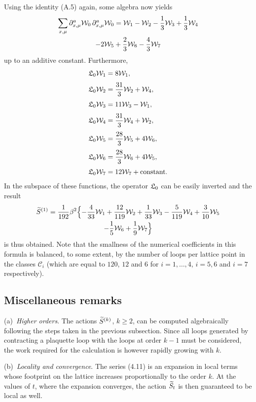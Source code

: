 Using the identity (A.5) again, some algebra now yields
\begin{multline}
  \sum_{x,\mu}\partial^a_{x,\mu}\mathcal{W}_0\,\partial^a_{x,\mu}\mathcal{W}_0
  =\mathcal{W}_1-\mathcal{W}_2-\frac{1}{3}\mathcal{W}_3+\frac{1}{3}\mathcal{W}_4\\
  -2\mathcal{W}_5+\frac{2}{3}\mathcal{W}_6-\frac{4}{3}\mathcal{W}_7
\end{multline}
up to an additive constant. Furthermore,
\begin{align}
  \mathfrak{L}_0\mathcal{W}_1&=8\mathcal{W}_1,
  \\[0.6ex]
  \mathfrak{L}_0\mathcal{W}_2&=\frac{31}{3}\mathcal{W}_2+\mathcal{W}_4,
  \\[0.6ex]
  \mathfrak{L}_0\mathcal{W}_3&=11\mathcal{W}_3-\mathcal{W}_1,
  \\[0.6ex]
  \mathfrak{L}_0\mathcal{W}_4&=\frac{31}{3}\mathcal{W}_4+\mathcal{W}_2,
  \\[0.6ex]
  \mathfrak{L}_0\mathcal{W}_5&=\frac{28}{3}\mathcal{W}_5+4\mathcal{W}_6,
  \\[0.6ex]
  \mathfrak{L}_0\mathcal{W}_6&=\frac{28}{3}\mathcal{W}_6+4\mathcal{W}_5,
  \\[0.6ex]
  \mathfrak{L}_0\mathcal{W}_7&=12\mathcal{W}_7+\text{constant}.
\end{align}
In the subspace of these functions,
the operator $\mathfrak{L}_0$ can be easily inverted
and the result
\begin{multline}
  \widetilde{S}^{(1)}=\frac{1}{192}\beta^2\Bigl\{
  -\frac{4}{33}\mathcal{W}_1
  +\frac{12}{119}\mathcal{W}_2
  +\frac{1}{33}\mathcal{W}_3
  -\frac{5}{119}\mathcal{W}_4
  +\frac{3}{10}\mathcal{W}_5\\
  -\frac{1}{5}\mathcal{W}_6
  +\frac{1}{9}\mathcal{W}_7\Bigr\}
\end{multline}
is thus obtained.
Note that the smallness of the numerical coefficients in this formula
is balanced, to some extent,
by the number of loops per lattice point
in the classes $\mathcal{C}_i$ (which are equal to
$120$, $12$ and $6$ for $i=1,\ldots,4$, $i=5,6$ and $i=7$ respectively).


\subsection{Miscellaneous remarks}

\noindent
(a)~{\itshape Higher orders}.
The actions $\widetilde{S}^{(k)}$, $k\geq2$, can
be computed algebraically
following the steps taken in the previous subsection.
Since all loops generated by contracting
a plaquette loop with the loops at order $k-1$
must be considered, the work required for
the calculation
is however rapidly growing with $k$.

\smallskip
\noindent
(b)~{\itshape Locality and convergence}. The series (4.11) is an
expansion in local terms whose footprint on the lattice
increases proportionally to the order $k$.
At the values of $t$, where the expansion converges,
the action $\widetilde{S}_t$ is then guaranteed to be local as well.

